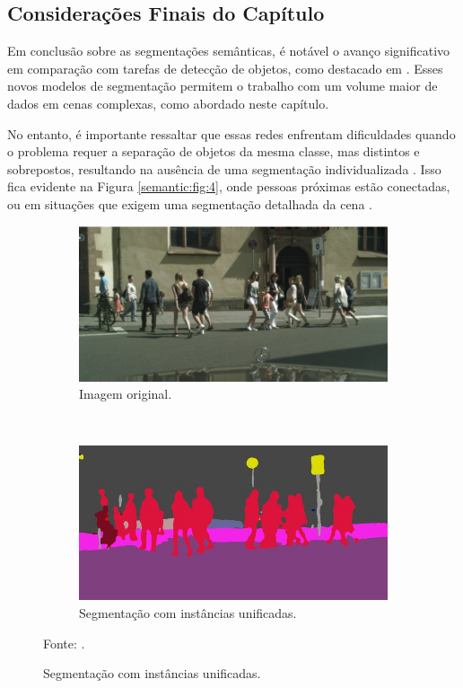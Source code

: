 \subsection{Considerações Finais do Capítulo}
\label{semantic:conclusion}
Em conclusão sobre as segmentações semânticas, é notável o avanço significativo em comparação com tarefas de detecção de objetos, como destacado em \cite{Vaillant1994}. Esses novos modelos de segmentação permitem o trabalho com um volume maior de dados em cenas complexas, como abordado neste capítulo.

No entanto, é importante ressaltar que essas redes enfrentam dificuldades quando o problema requer a separação de objetos da mesma classe, mas distintos e sobrepostos, resultando na ausência de uma segmentação individualizada \citep{Kirillov2019a}. Isso fica evidente na Figura \ref{semantic:fig:4}, onde pessoas próximas estão conectadas, ou em situações que exigem uma segmentação detalhada da cena \citep{Ghosh2019}.

\begin{figure}[H]
   \caption{Exemplo de segmentação semântica com instâncias unificadas.}
   \centering
   \label{semantic:fig:4}
    \begin{subfigure}[t]{0.8\textwidth}
        \centering
        \includegraphics[width=1\linewidth]{recursos/imagens/semantic/sema_ori.png}
        \caption{Imagem original.}
        \label{semantic:fig:4.1}
    \end{subfigure}%
    ~ 

    \begin{subfigure}[t]{0.8\textwidth}
        \centering
        \includegraphics[width=1\linewidth]{recursos/imagens/semantic/sema_unified.png}
        \caption{Segmentação com instâncias unificadas.}
        \label{semantic:fig:4.2}
    \end{subfigure}%

    Fonte: \cite{Fischer2017}.
\end{figure}

